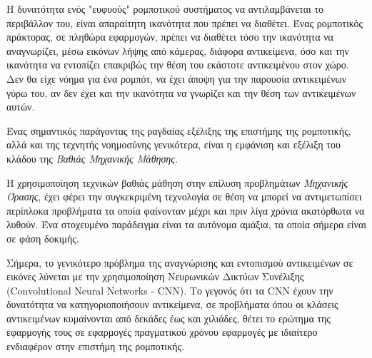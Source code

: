 Η δυνατότητα ενός "ευφυούς" ρομποτικού συστήματος να αντιλαμβάνεται
το περιβάλλον του, είναι απαραίτητη ικανότητα που πρέπει να διαθέτει.
Ένας ρομποτικός πράκτορας, σε πληθώρα εφαρμογών, πρέπει να διαθέτει τόσο την
ικανότητα να αναγνωρίζει, μέσω εικόνων λήψης από κάμερας, διάφορα αντικείμενα,
όσο και την ικανότητα να εντοπίζει επακριβώς την θέση του
εκάστοτε αντικειμένου στον χώρο. Δεν θα είχε νόημα για ένα ρομπότ, να έχει άποψη
για την παρουσία αντικειμένων γύρω του, αν δεν έχει και την ικανότητα να γνωρίζει
και την θέση των αντικειμένων αυτών.

Ένας σημαντικός παράγοντας της ραγδαίας εξέλιξης της επιστήμης της ρομποτικής, αλλά
και της τεχνητής νοημοσύνης γενικότερα, είναι η εμφάνιση και εξέλιξη του κλάδου
της \emph{Βαθιάς Μηχανικής Μάθησης}.

Η χρησιμοποίηση τεχνικών βαθιάς μάθηση στην επίλυση προβλημάτων \emph{Μηχανικής Όρασης},
έχει φέρει την συγκεκριμένη τεχνολογία σε θέση να μπορεί να αντιμετωπίσει
περίπλοκα προβλήματα τα οποία φαίνονταν μέχρι και πριν λίγα χρόνια ακατόρθωτα να λυθούν.
Ένα στοχευμένο παράδειγμα είναι τα αυτόνομα αμάξια, τα οποία σήμερα είναι σε
φάση δοκιμής.

Σήμερα, το γενικότερο πρόβλημα της αναγνώρισης και εντοπισμού αντικειμένων σε εικόνες
λύνεται με την χρησιμοποίηση Νευρωνικών Δικτύων Συνέλιξης (Convolutional Neural Networks - CNN).
Το γεγονός ότι τα CNN έχουν την δυνατότητα να κατηγοριοποιήσουν αντικείμενα,
σε προβλήματα όπου οι κλάσεις αντικειμένων κυμαίνονται από δεκάδες έως και χιλιάδες,
θέτει το ερώτημα της εφαρμογής τους σε εφαρμογές πραγματικού χρόνου εφαρμογές
με ιδιαίτερο ενδιαφέρον στην επιστήμη της ρομποτικής.




